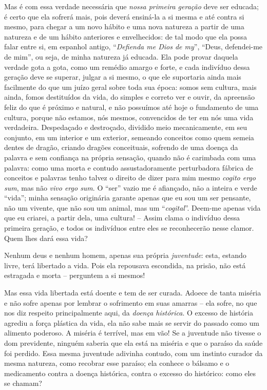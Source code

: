     Mas é com essa verdade necessária que \emph{nossa primeira geração}
    deve ser educada; é certo que ela sofrerá mais, pois deverá
    ensiná-la a si mesma e até contra si mesmo, para chegar a um novo
    hábito e uma nova natureza a partir de uma natureza e de um hábito
    anteriores e envelhecidos: de tal modo que ela possa falar entre si,
    em espanhol antigo, ``\emph{Defienda me Dios de my}'', ``Deus,
    defendei-me de mim'', ou seja, de minha natureza já educada. Ela
    pode provar daquela verdade gota a gota, como um remédio amargo e
    forte, e cada indivíduo dessa geração deve se superar, julgar a si
    mesmo, o que ele suportaria ainda mais facilmente do que um juízo
    geral sobre toda sua época: somos sem cultura, mais ainda, fomos
    destituídos da vida, do simples e correto ver e ouvir, da apreensão
    feliz do que é próximo e natural, e não possuímos até hoje o
    fundamento de uma cultura, porque não estamos, nós mesmos,
    convencidos de ter em nós uma vida verdadeira. Despedaçado e
    destroçado, dividido meio mecanicamente, em seu conjunto, em um
    interior e um exterior, semeando conceitos como quem semeia dentes
    de dragão, criando dragões conceituais, sofrendo de uma doença da
    palavra e sem confiança na própria sensação, quando não é carimbada
    com uma palavra: como uma morta e contudo assustadoramente
    perturbadora fábrica de conceitos e palavras tenho talvez o direito
    de dizer para mim mesmo \emph{cogito ergo sum}, mas não \emph{vivo
    ergo sum}. O ``ser'' vazio me é afiançado, não a inteira e verde
    ``vida''; minha sensação originária garante apenas que eu sou um ser
    pensante, não um vivente, que não sou um animal, mas um
    ``\emph{cogital}''. Deem-me apenas vida que eu criarei, a partir
    dela, uma cultura! -- Assim clama o indivíduo dessa primeira
    geração, e todos os indivíduos entre eles se reconhecerão nesse
    clamor. Quem lhes dará essa vida?

    Nenhum deus e nenhum homem, apenas sua própria \emph{juventude}:
    esta, estando livre, terá libertado a vida. Pois ela repousava
    escondida, na prisão, não está estragada e morta -- perguntem a si
    mesmos!

    Mas essa vida libertada está doente e tem de ser curada. Adoece de
    tanta miséria e não sofre apenas por lembrar o sofrimento em suas
    amarras -- ela sofre, no que nos diz respeito principalmente aqui,
    da \emph{doença histórica}. O excesso de história agrediu a força
    plástica da vida, ela não sabe mais se servir do passado como um
    alimento poderoso. A miséria é terrível, mas em vão! Se a juventude
    não tivesse o dom previdente, ninguém saberia que ela está na
    miséria e que o paraíso da saúde foi perdido. Essa mesma juventude
    adivinha contudo, com um instinto curador da mesma natureza, como
    recobrar esse paraíso; ela conhece o bálsamo e o medicamento contra
    a doença histórica, contra o excesso do histórico: como eles se
    chamam?


